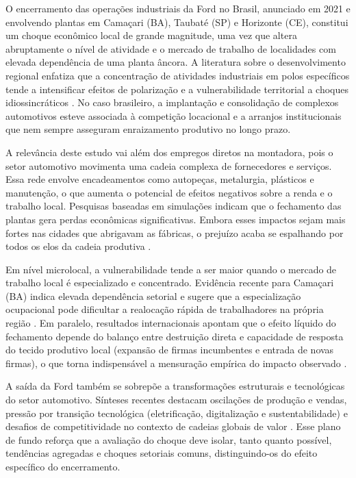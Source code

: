 \documentclass[12pt,a4paper]{article}
\begin{document}
O encerramento das opera\c{c}\~oes industriais da Ford no Brasil, anunciado em 2021 e envolvendo plantas em Cama\c{c}ari (BA), Taubat\'e (SP) e Horizonte (CE), constitui um choque econ\^omico local de grande magnitude, uma vez que altera abruptamente o n\'ivel de atividade e o mercado de trabalho de localidades com elevada depend\^encia de uma planta \^ancora. A literatura sobre o desenvolvimento regional enfatiza que a concentra\c{c}\~ao de atividades industriais em polos espec\'ificos tende a intensificar efeitos de polariza\c{c}\~ao e a vulnerabilidade territorial a choques idiossincr\'aticos \parencite{yeung2017}. No caso brasileiro, a implanta\c{c}\~ao e consolida\c{c}\~ao de complexos automotivos esteve associada \`a competi\c{c}\~ao locacional e a arranjos institucionais que nem sempre asseguram enraizamento produtivo no longo prazo.

A relev\^ancia deste estudo vai al\'em dos empregos diretos na montadora, pois o setor automotivo movimenta uma cadeia complexa de fornecedores e servi\c{c}os. Essa rede envolve encadeamentos como autopeças, metalurgia, pl\'asticos e manuten\c{c}\~ao, o que aumenta o potencial de efeitos negativos sobre a renda e o trabalho local. Pesquisas baseadas em simula\c{c}\~oes indicam que o fechamento das plantas gera perdas econ\^omicas significativas. Embora esses impactos sejam mais fortes nas cidades que abrigavam as f\'abricas, o preju\'izo acaba se espalhando por todos os elos da cadeia produtiva \parencite{domingues2020,fernandes2021}.

Em n\'ivel microlocal, a vulnerabilidade tende a ser maior quando o mercado de trabalho local \'e especializado e concentrado. Evid\^encia recente para Cama\c{c}ari (BA) indica elevada depend\^encia setorial e sugere que a especializa\c{c}\~ao ocupacional pode dificultar a realoca\c{c}\~ao r\'apida de trabalhadores na pr\'opria regi\~ao \parencite{henriques2024}. Em paralelo, resultados internacionais apontam que o efeito l\'iquido do fechamento depende do balan\c{c}o entre destrui\c{c}\~ao direta e capacidade de resposta do tecido produtivo local (expans\~ao de firmas incumbentes e entrada de novas firmas), o que torna indispens\'avel a mensura\c{c}\~ao emp\'irica do impacto observado \parencite{jofremonseny2018}.

A sa\'ida da Ford tamb\'em se sobrep\~oe a transforma\c{c}\~oes estruturais e tecnol\'ogicas do setor automotivo. S\'inteses recentes destacam oscila\c{c}\~oes de produ\c{c}\~ao e vendas, press\~ao por transi\c{c}\~ao tecnol\'ogica (eletrifica\c{c}\~ao, digitaliza\c{c}\~ao e sustentabilidade) e desafios de competitividade no contexto de cadeias globais de valor \parencite{porter1990,marx2026,vargas2021}. Esse plano de fundo refor\c{c}a que a avalia\c{c}\~ao do choque deve isolar, tanto quanto poss\'ivel, tend\^encias agregadas e choques setoriais comuns, distinguindo-os do efeito espec\'ifico do encerramento.
\end{document}
